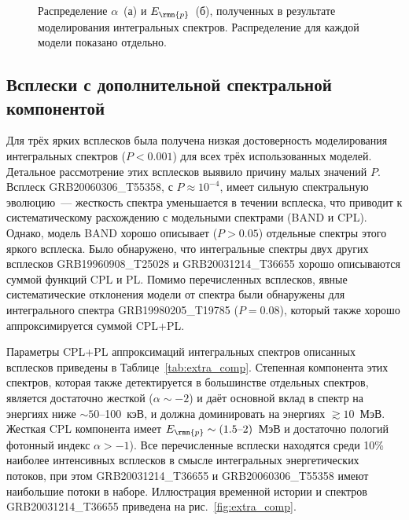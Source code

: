 
\begin{figure}
	\begin{minipage}[h]{0.5\textwidth}
    \end{minipage}
    \hfill
    \begin{minipage}[h]{0.5\textwidth}
	\end{minipage}
    \caption{
    Распределение $\alpha$~(а) и $E_\rmn{p}$~(б), полученных 
    в результате моделирования интегральных спектров. Распределение для каждой модели
    показано отдельно.
    \label{fig:par_dist} }
\end{figure}

\subsection{Всплески с дополнительной спектральной компонентой}
Для трёх ярких всплесков была получена низкая достоверность моделирования 
интегральных спектров ($P<0.001$) для всех трёх использованных моделей. 
Детальное рассмотрение этих всплесков выявило причину малых значений $P$.
Всплеск GRB20060306\_T55358, с $P \approx 10^{-4}$, имеет сильную 
спектральную эволюцию~--- жесткость спектра уменьшается в течении всплеска, 
что приводит к систематическому расхождению с модельными спектрами (BAND и CPL).
Однако, модель BAND хорошо описывает ($P>0.05$) отдельные спектры этого яркого всплеска.
Было обнаружено, что интегральные спектры двух других всплесков GRB19960908\_T25028 и GRB20031214\_T36655
хорошо описываются суммой функций CPL и PL.
Помимо перечисленных всплесков, явные систематические отклонения модели от спектра
были обнаружены для интегрального спектра GRB19980205\_T19785 ($P=0.08$), 
который также хорошо аппроксимируется суммой CPL+PL.
 
Параметры CPL+PL аппроксимаций интегральных спектров описанных всплесков приведены в Таблице~\ref{tab:extra_comp}. 
Степенная компонента этих спектров, которая также детектируется в большинстве отдельных спектров,
является достаточно жесткой ($\alpha \sim -2$) и даёт основной вклад в спектр на  
энергиях ниже $\sim 50$--100~кэВ, и должна доминировать на энергиях $\gtrsim 10$~МэВ.
Жесткая CPL компонента имеет $E_\rmn{p}\sim(1.5\textrm{--}2)$~МэВ и достаточно пологий
фотонный индекс $\alpha > -1$).
Все перечисленные всплески находятся среди 10\% наиболее интенсивных всплесков
в смысле интегральных энергетических потоков, при этом
GRB20031214\_T36655 и GRB20060306\_T55358 имеют наибольшие потоки в наборе.
Иллюстрация временной истории и спектров GRB20031214\_T36655 приведена на рис.~\ref{fig:extra_comp}.

